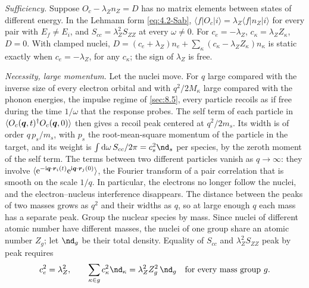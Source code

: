 \emph{Sufficiency.} Suppose $O_c - \lambda_Zn_Z = D$ has no matrix elements between states of different energy. In the Lehmann form \cref{eq:4.2-Sab}, $\langle f|O_c|i\rangle = \lambda_Z\langle f|n_Z|i\rangle$ for every pair with $E_f \ne E_i$, and $S_{cc} = \lambda_Z^2S_{ZZ}$ at every $\omega \ne 0$. For $c_e = -\lambda_Z$, $c_\kappa = \lambda_ZZ_\kappa$, $D = 0$. With clamped nuclei, $D = (c_e + \lambda_Z)n_e + \sum_\kappa(c_\kappa - \lambda_ZZ_\kappa)n_\kappa$ is static exactly when $c_e = -\lambda_Z$, for any $c_\kappa$; the sign of $\lambda_Z$ is free.

\emph{Necessity, large momentum.} Let the nuclei move. For $q$ large compared with the inverse size of every electron orbital and with $q^2/2M_\kappa$ large compared with the phonon energies, the impulse regime of \cref{sec:8.5}, every particle recoils as if free during the time $1/\omega$ that the response probes. The self term of each particle in $\langle O_c(\bm{q},t)^\dagger O_c(\bm{q},0)\rangle$ then gives a recoil peak centered at $q^2/2m_s$. Its width is of order $q\,p_s/m_s$, with $p_s$ the root-mean-square momentum of the particle in the target, and its weight is $\int\dd\omega\,S_{cc}/2\pi = c_s^2\nd_s$ per species, by the zeroth moment of the self term. The terms between two different particles vanish as $q \to \infty$: they involve $\langle\mathrm{e}^{-\mathrm{i}\bm{q}\cdot\bm{r}_i(t)}\mathrm{e}^{\mathrm{i}\bm{q}\cdot\bm{r}_j(0)}\rangle$, the Fourier transform of a pair correlation that is smooth on the scale $1/q$. In particular, the electrons no longer follow the nuclei, and the electron--nucleus interference disappears. The distance between the peaks of two masses grows as $q^2$ and their widths as $q$, so at large enough $q$ each mass has a separate peak. Group the nuclear species by mass. Since nuclei of different atomic number have different masses, the nuclei of one group share an atomic number $Z_g$; let $\nd_g$ be their total density. Equality of $S_{cc}$ and $\lambda_Z^2S_{ZZ}$ peak by peak requires
\begin{equation}
  c_e^2 = \lambda_Z^2 , \qquad \sum_{\kappa\in g}c_\kappa^2\nd_\kappa = \lambda_Z^2Z_g^2\,\nd_g \quad\text{for every mass group } g .
  \label{eq:D.27-peaks}
\end{equation}

